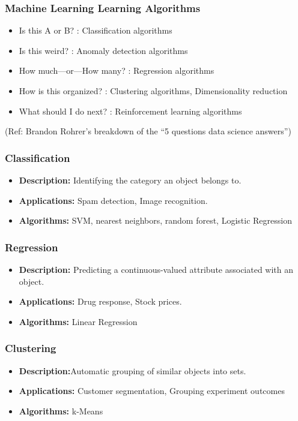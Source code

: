 \begin{frame}[fragile]\frametitle{Machine Learning Learning Algorithms}

\begin{itemize}
\item Is this A or B? : Classification algorithms
\item Is this weird? : Anomaly detection algorithms
\item How much—or—How many? : Regression algorithms
\item How is this organized? : Clustering algorithms, Dimensionality reduction
\item What should I do next? : Reinforcement learning algorithms
\end{itemize}

\tiny{(Ref: Brandon Rohrer's breakdown of the ``5 questions data science answers'')}

\end{frame}

\begin{frame}[fragile]\frametitle{Classification}
\begin{itemize}
\item \textbf{Description:} Identifying the category an object belongs to.
\item \textbf{Applications:} Spam detection, Image recognition.
\item \textbf{Algorithms:} SVM, nearest neighbors, random forest, Logistic Regression
\end{itemize}
\end{frame}


\begin{frame}[fragile]\frametitle{Regression}
\begin{itemize}
\item \textbf{Description:} Predicting a continuous-valued attribute associated with an object.
\item \textbf{Applications:} Drug response, Stock prices.
\item \textbf{Algorithms:} Linear Regression 
\end{itemize}
\end{frame}

\begin{frame}[fragile]\frametitle{Clustering}
\begin{itemize}
\item \textbf{Description:}Automatic grouping of similar objects into sets.
\item \textbf{Applications:} Customer segmentation, Grouping experiment outcomes
\item \textbf{Algorithms:} k-Means
\end{itemize}
\end{frame}

